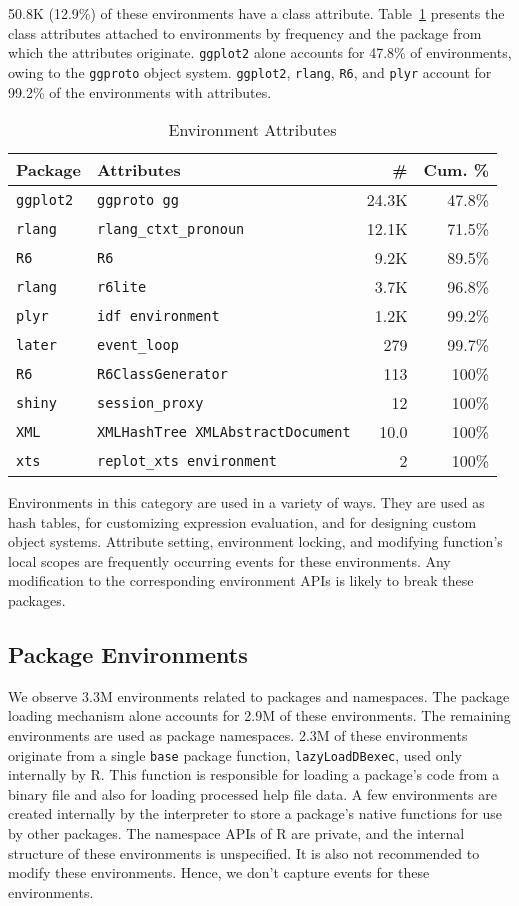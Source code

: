 \documentclass[10pt,review,sigplan,authorversion=true]{acmart}
\renewcommand{\c}[1]{\lstinline |#1|\xspace}
\begin{document}
50.8K (12.9\%) of these environments have a class attribute.
Table~\ref{table:explicit_env_attr} presents the class attributes attached to
environments by frequency and the package from which the attributes originate.
\c{ggplot2} alone accounts for 47.8\% of environments, owing to the
\c{ggproto} object system. \c{ggplot2}, \c{rlang}, \c{R6}, and
\c{plyr} account for 99.2\% of the environments with attributes.
\begin{table}[!h]
  \small
  \caption{Environment Attributes} \label{table:explicit_env_attr}
  \centering
  \begin{tabular}{@{}ll@{}rr@{}}
    \toprule
    \textbf{Package}&\textbf{Attributes}&\textbf{\#}&\textbf{Cum. \%}\\
    \midrule
    \texttt{ggplot2}&\texttt{ggproto gg}&24.3K&47.8\%\\
    \texttt{rlang}&\texttt{rlang\_ctxt\_pronoun}&12.1K&71.5\%\\
    \texttt{R6}&\texttt{R6}&9.2K&89.5\%\\
    \texttt{rlang}&\texttt{r6lite}&3.7K&96.8\%\\
    \texttt{plyr}&\texttt{idf environment}&1.2K&99.2\%\\
    \texttt{later}&\texttt{event\_loop}&279&99.7\%\\
    \texttt{R6}&\texttt{R6ClassGenerator}&113&100\%\\
    \texttt{shiny}&\texttt{session\_proxy}&12&100\%\\
    \texttt{XML}&\texttt{XMLHashTree XMLAbstractDocument}&10.0&100\%\\
    \texttt{xts}&\texttt{replot\_xts environment}&2&100\%\\
    \bottomrule
  \end{tabular}
\end{table}

Environments in this category are used in a variety of ways. They are used as
hash tables, for customizing expression evaluation, and for designing custom
object systems. Attribute setting, environment locking, and modifying function's
local scopes are frequently occurring events for these environments. Any
modification to the corresponding environment APIs is likely to break these
packages.


\subsection{Package Environments}

We observe 3.3M environments related to packages and namespaces. The package
loading mechanism alone accounts for 2.9M of these environments. The remaining
environments are used as package namespaces. 2.3M of these environments
originate from a single \c{base} package function, \c{lazyLoadDBexec},
used only internally by R. This function is responsible for loading a package's
code from a binary file and also for loading processed help file data. A few
environments are created internally by the interpreter to store a package's
native functions for use by other packages. The namespace APIs of R are private,
and the internal structure of these environments is unspecified. It is also not
recommended to modify these environments. Hence, we don't capture events for
these environments.
\end{document}
